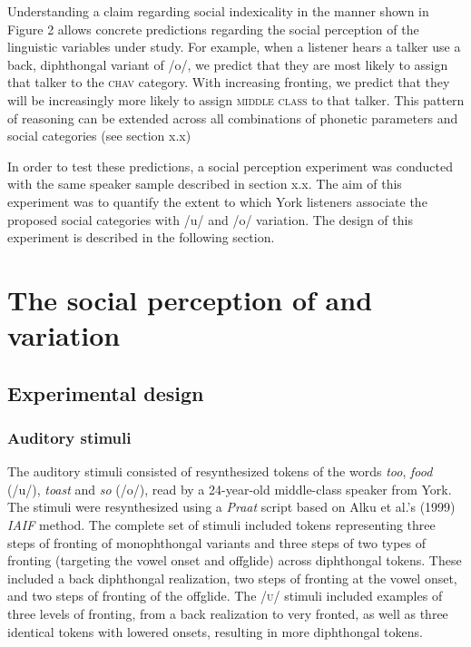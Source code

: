 \documentclass[PWPL]{article}
\begin{document}
Understanding a claim regarding social indexicality in the manner shown in Figure 2 allows concrete predictions regarding the social perception of the linguistic variables under study. For example, when a listener hears a talker use a back, diphthongal variant of /o/, we predict that they are most likely to assign that talker to the \textsc{chav} category. With increasing fronting, we predict that they will be increasingly more likely to assign \textsc{middle class} to that talker. This pattern of reasoning can be extended across all combinations of phonetic parameters and social categories (see section x.x)

In order to test these predictions, a social perception experiment was conducted with the same speaker sample described in section x.x. The aim of this experiment was to quantify the extent to which York listeners associate the proposed social categories with /u/ and /o/ variation. The design of this experiment is described in the following section.

\section{The social perception of  and  variation}

\subsection{Experimental design}
\subsubsection{Auditory stimuli}

The auditory stimuli consisted of resynthesized tokens of the words \textit{too}, \textit{food} (/u/), \textit{toast} and \textit{so} (/o/), read by a 24-year-old middle-class speaker from York. The stimuli were resynthesized using a \textit{Praat} script based on Alku et al.'s (1999) \textit{IAIF} method. The complete set of  stimuli included tokens representing three steps of fronting of monophthongal variants and three steps of two types of fronting (targeting the vowel onset and offglide) across diphthongal tokens. These included a back diphthongal realization, two steps of fronting at the vowel onset, and two steps of fronting of the offglide. The \textsc{/u/} stimuli included examples of three levels of fronting, from a back realization to very fronted, as well as three identical tokens with lowered onsets, resulting in more diphthongal tokens.
\end{document}
